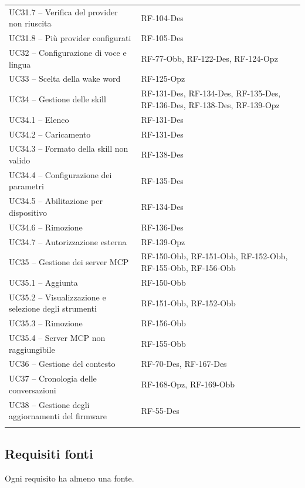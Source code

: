 \documentclass[12pt,a4paper]{article}
\newcommand{\rl}{\\ \arrayrulecolor{bfline}\hline}
\begin{document}
\begin{longtable}{>{\raggedright\arraybackslash}p{}>{\raggedright\arraybackslash}p{}}
UC31.7 -- Verifica del provider non riuscita & RF-104-Des \rl
UC31.8 -- Più provider configurati & RF-105-Des \rl
UC32 -- Configurazione di voce e lingua & RF-77-Obb, RF-122-Des, RF-124-Opz \rl
UC33 -- Scelta della wake word & RF-125-Opz \rl
UC34 -- Gestione delle skill & RF-131-Des, RF-134-Des, RF-135-Des, RF-136-Des, RF-138-Des, RF-139-Opz \rl
UC34.1 -- Elenco & RF-131-Des \rl
UC34.2 -- Caricamento & RF-131-Des \rl
UC34.3 -- Formato della skill non valido & RF-138-Des \rl
UC34.4 -- Configurazione dei parametri & RF-135-Des \rl
UC34.5 -- Abilitazione per dispositivo & RF-134-Des \rl
UC34.6 -- Rimozione & RF-136-Des \rl
UC34.7 -- Autorizzazione esterna & RF-139-Opz \rl
UC35 -- Gestione dei server MCP & RF-150-Obb, RF-151-Obb, RF-152-Obb, RF-155-Obb, RF-156-Obb \rl
UC35.1 -- Aggiunta & RF-150-Obb \rl
UC35.2 -- Visualizzazione e selezione degli strumenti & RF-151-Obb, RF-152-Obb \rl
UC35.3 -- Rimozione & RF-156-Obb \rl
UC35.4 -- Server MCP non raggiungibile & RF-155-Obb \rl
UC36 -- Gestione del contesto & RF-70-Des, RF-167-Des \rl
UC37 -- Cronologia delle conversazioni & RF-168-Opz, RF-169-Obb \rl
UC38 -- Gestione degli aggiornamenti del firmware & RF-55-Des \rl
\end{longtable}


\subsection{Requisiti \textrightarrow{} fonti}

Ogni requisito ha almeno una fonte.
\end{document}

